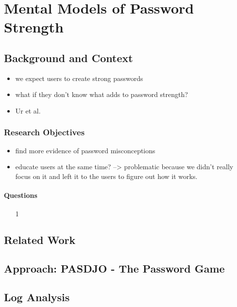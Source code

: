 \chapter[Mental Models of Password Strength]{Mental Models of Password Strength}\label{chap:pasdjo}

\section{Background and Context}

\begin{itemize}
\item we expect users to create strong passwords
\item what if they don't know what adds to password strength?
\item Ur et al.
\end{itemize}


\subsection{Research Objectives}
\begin{itemize}
	\item find more evidence of password misconceptions
	\item educate users at the same time? --> problematic because we didn't really focus on it and left it to the users to figure out how it works.
\end{itemize}

\subsubsection{Questions}
\begin{itemize}
\item[1] 
\end{itemize}

\section{Related Work}

\section{Approach: PASDJO - The Password Game}


\section{Log Analysis}

